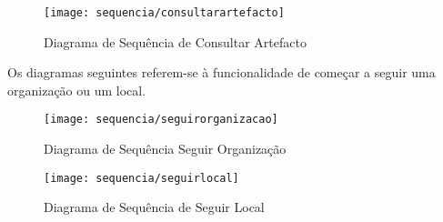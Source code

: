 \documentclass[12pt,a4paper]{article}
\begin{document}
\begin{figure}[h!]
\centering
\texttt{[image: sequencia/consultarartefacto]}
\caption{Diagrama de Sequência de Consultar Artefacto} 
\end{figure}

Os diagramas seguintes referem-se à funcionalidade de começar a seguir uma organização ou um local.\\

\begin{figure}[h!]
\centering
\texttt{[image: sequencia/seguirorganizacao]}
\caption{Diagrama de Sequência Seguir Organização} 
\end{figure}

\begin{figure}[h!]
\centering
\texttt{[image: sequencia/seguirlocal]}
\caption{Diagrama de Sequência de Seguir Local} 
\end{figure}
\end{document}
